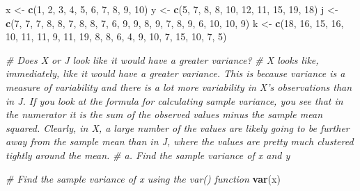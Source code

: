 \documentclass[]{article}
\newenvironment{Shaded}{\begin{snugshade}}{\end{snugshade}}
\newcommand{\KeywordTok}[1]{\textcolor[rgb]{0.13,0.29,0.53}{\textbf{#1}}}
\newcommand{\DecValTok}[1]{\textcolor[rgb]{0.00,0.00,0.81}{#1}}
\newcommand{\StringTok}[1]{\textcolor[rgb]{0.31,0.60,0.02}{#1}}
\newcommand{\CommentTok}[1]{\textcolor[rgb]{0.56,0.35,0.01}{\textit{#1}}}
\newcommand{\NormalTok}[1]{#1}
\begin{document}
\begin{Shaded}
\begin{Highlighting}[]
\NormalTok{x <-}\StringTok{ }\KeywordTok{c}\NormalTok{(}\DecValTok{1}\NormalTok{, }\DecValTok{2}\NormalTok{, }\DecValTok{3}\NormalTok{, }\DecValTok{4}\NormalTok{, }\DecValTok{5}\NormalTok{, }\DecValTok{6}\NormalTok{, }\DecValTok{7}\NormalTok{, }\DecValTok{8}\NormalTok{, }\DecValTok{9}\NormalTok{, }\DecValTok{10}\NormalTok{)}
\NormalTok{y <-}\StringTok{ }\KeywordTok{c}\NormalTok{(}\DecValTok{5}\NormalTok{, }\DecValTok{7}\NormalTok{, }\DecValTok{8}\NormalTok{, }\DecValTok{8}\NormalTok{, }\DecValTok{10}\NormalTok{, }\DecValTok{12}\NormalTok{, }\DecValTok{11}\NormalTok{, }\DecValTok{15}\NormalTok{, }\DecValTok{19}\NormalTok{, }\DecValTok{18}\NormalTok{)}
\NormalTok{j <-}\StringTok{ }\KeywordTok{c}\NormalTok{(}\DecValTok{7}\NormalTok{, }\DecValTok{7}\NormalTok{, }\DecValTok{7}\NormalTok{, }\DecValTok{8}\NormalTok{, }\DecValTok{8}\NormalTok{, }\DecValTok{7}\NormalTok{, }\DecValTok{8}\NormalTok{, }\DecValTok{8}\NormalTok{, }\DecValTok{7}\NormalTok{, }\DecValTok{6}\NormalTok{, }\DecValTok{9}\NormalTok{, }\DecValTok{9}\NormalTok{, }\DecValTok{8}\NormalTok{, }\DecValTok{9}\NormalTok{, }\DecValTok{7}\NormalTok{, }\DecValTok{8}\NormalTok{, }\DecValTok{9}\NormalTok{, }\DecValTok{6}\NormalTok{, }\DecValTok{10}\NormalTok{, }\DecValTok{10}\NormalTok{, }\DecValTok{9}\NormalTok{)}
\NormalTok{k <-}\StringTok{ }\KeywordTok{c}\NormalTok{(}\DecValTok{18}\NormalTok{, }\DecValTok{16}\NormalTok{, }\DecValTok{15}\NormalTok{, }\DecValTok{16}\NormalTok{, }\DecValTok{10}\NormalTok{, }\DecValTok{11}\NormalTok{, }\DecValTok{11}\NormalTok{, }\DecValTok{9}\NormalTok{, }\DecValTok{11}\NormalTok{, }\DecValTok{19}\NormalTok{, }\DecValTok{8}\NormalTok{, }\DecValTok{8}\NormalTok{, }\DecValTok{6}\NormalTok{, }\DecValTok{4}\NormalTok{, }\DecValTok{9}\NormalTok{, }\DecValTok{10}\NormalTok{, }\DecValTok{7}\NormalTok{, }\DecValTok{15}\NormalTok{, }\DecValTok{10}\NormalTok{, }\DecValTok{7}\NormalTok{, }\DecValTok{5}\NormalTok{)}

\CommentTok{# Does X or J look like it would have a greater variance? }
\CommentTok{# X looks like, immediately, like it would have a greater variance. This is because variance is a measure of variability and there is a lot more variability in X's observations than in J. If you look at the formula for calculating sample variance, you see that in the numerator it is the sum of the observed values minus the sample mean squared. Clearly, in X, a large number of the values are likely going to be further away from the sample mean than in J, where the values are pretty much clustered tightly around the mean. }
\CommentTok{# a. Find the sample variance of x and y}

\CommentTok{# Find the sample variance of x using the var() function}
\KeywordTok{var}\NormalTok{(x)}
\end{Highlighting}
\end{Shaded}
\end{document}
